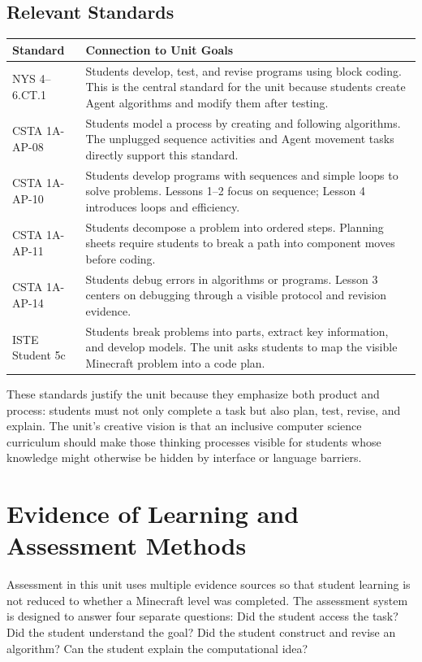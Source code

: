 \documentclass[12pt]{article}
\newcommand{\arow}{\rowcolor{altRow}}
\begin{document}
\subsection{Relevant Standards}
\begin{tabularx}{\textwidth}{|P{1.4in}|L|}
\hline
{}\color{white}\bfseries Standard & \color{white}\bfseries Connection to Unit Goals \\
\hline
NYS 4--6.CT.1 & Students develop, test, and revise programs using block coding. This is the central standard for the unit because students create Agent algorithms and modify them after testing. \\
\hline
\arow CSTA 1A-AP-08 & Students model a process by creating and following algorithms. The unplugged sequence activities and Agent movement tasks directly support this standard. \\
\hline
CSTA 1A-AP-10 & Students develop programs with sequences and simple loops to solve problems. Lessons 1--2 focus on sequence; Lesson 4 introduces loops and efficiency. \\
\hline
\arow CSTA 1A-AP-11 & Students decompose a problem into ordered steps. Planning sheets require students to break a path into component moves before coding. \\
\hline
CSTA 1A-AP-14 & Students debug errors in algorithms or programs. Lesson 3 centers on debugging through a visible protocol and revision evidence. \\
\hline
\arow ISTE Student 5c & Students break problems into parts, extract key information, and develop models. The unit asks students to map the visible Minecraft problem into a code plan. \\
\hline
\end{tabularx}

These standards justify the unit because they emphasize both product and process: students must not only complete a task but also plan, test, revise, and explain. The unit's creative vision is that an inclusive computer science curriculum should make those thinking processes visible for students whose knowledge might otherwise be hidden by interface or language barriers.

\section{Evidence of Learning and Assessment Methods}
Assessment in this unit uses multiple evidence sources so that student learning is not reduced to whether a Minecraft level was completed. The assessment system is designed to answer four separate questions: Did the student access the task? Did the student understand the goal? Did the student construct and revise an algorithm? Can the student explain the computational idea?
\end{document}
